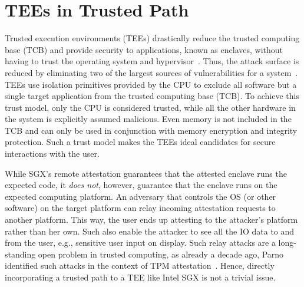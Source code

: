 \section{TEEs in Trusted Path}

Trusted execution environments (TEEs) drastically reduce the trusted computing base (TCB) and provide security to applications, known as enclaves, without having to trust the operating system and hypervisor~\cite{costan2016intel,winter2008trusted,costan2016sanctum}. Thus, the attack surface is reduced by eliminating two of the largest sources of vulnerabilities for a system~\cite{checkoway2013iago,suzaki2011memory}. TEEs use isolation primitives provided by the CPU to exclude all software but a single target application from the trusted computing base (TCB). To achieve this trust model, only the CPU is considered trusted, while all the other hardware in the system is explicitly assumed malicious. Even memory is not included in the TCB and can only be used in conjunction with memory encryption and integrity protection. Such a trust model makes the TEEs ideal candidates for secure interactions with the user. 


While SGX's remote attestation guarantees that the attested enclave runs the expected code, it \emph{does not}, however,  guarantee that the enclave runs on the expected computing platform. An adversary that controls the OS (or other software) on the target platform can relay incoming attestation requests to another platform. This way, the user ends up attesting to the attacker's platform rather than her own. Such also enable the attacker to see all the IO data to and from the user, e.g., sensitive user input on display. Such relay attacks are a long-standing open problem in trusted computing, as already a decade ago, Parno identified such attacks in the context of TPM attestation~\cite{parno2008bootstrapping}. Hence, directly incorporating a trusted path to a TEE like Intel SGX is not a trivial issue.



